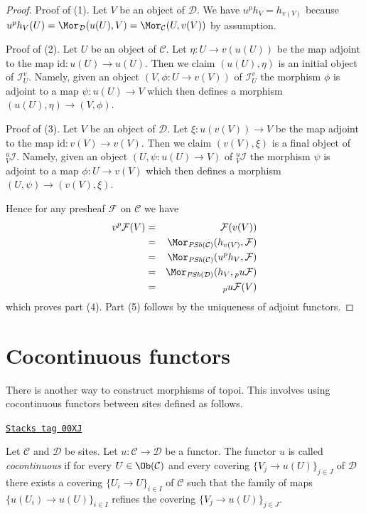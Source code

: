 \begin{proof}
Proof of (1). Let $V$ be an object of $\mathcal{D}$. We have
$u^ph_V = h_{v(V)}$ because
$u^ph_V(U) = \Mor_\mathcal{D}(u(U), V) = \Mor_\mathcal{C}(U, v(V))$
by assumption.

\medskip\noindent
Proof of (2). Let $U$ be an object of $\mathcal{C}$. Let
$\eta : U \to v(u(U))$ be the map adjoint to the map
$\text{id} : u(U) \to u(U)$. Then we claim $(u(U), \eta)$
is an initial object of $\mathcal{I}_U^v$. Namely, given
an object $(V, \phi : U \to v(V))$ of $\mathcal{I}_U^v$
the morphism $\phi$ is adjoint to a map $\psi : u(U) \to V$
which then defines a morphism $(u(U), \eta) \to (V, \phi)$.

\medskip\noindent
Proof of (3). Let $V$ be an object of $\mathcal{D}$. Let
$\xi : u(v(V)) \to V$ be the map adjoint to the map
$\text{id} : v(V) \to v(V)$. Then we claim $(v(V), \xi)$
is a final object of ${}_V^u\mathcal{I}$. Namely, given
an object $(U, \psi : u(U) \to V)$ of ${}_V^u\mathcal{I}$
the morphism $\psi$ is adjoint to a map $\phi : U \to v(V)$
which then defines a morphism $(U, \psi) \to (v(V), \xi)$.

\medskip\noindent
Hence for any presheaf $\mathcal{F}$ on $\mathcal{C}$ we have
\begin{eqnarray*}
v^p\mathcal{F}(V)
& = &
\mathcal{F}(v(V)) \\
& = &
\Mor_{\textit{PSh}(\mathcal{C})}(h_{v(V)}, \mathcal{F}) \\
& = &
\Mor_{\textit{PSh}(\mathcal{C})}(u^ph_V, \mathcal{F}) \\
& = &
\Mor_{\textit{PSh}(\mathcal{D})}(h_V, {}_pu\mathcal{F}) \\
& = &
{}_pu\mathcal{F}(V)
\end{eqnarray*}
which proves part (4). Part (5) follows by the uniqueness of adjoint functors.
\end{proof}

\section{Cocontinuous functors}
\label{sites-section-cocontinuous-functors}
There is another way to construct morphisms of topoi.
This involves using cocontinuous functors between sites defined as
follows.

\begin{definition}[Cocontinuous]
\label{sites-definition-cocontinuous}
\href{https://stacks.math.columbia.edu/tag/00XJ}{\texttt{Stacks tag 00XJ}}

Let $\mathcal{C}$ and $\mathcal{D}$ be sites.
Let $u : \mathcal{C} \to \mathcal{D}$ be a functor.
The functor $u$ is called {\it cocontinuous}
if for every $U \in \Ob(\mathcal{C})$
and every covering $\{V_j \to u(U)\}_{j \in J}$ of $\mathcal{D}$
there exists a covering
$\{U_i \to U\}_{i\in I}$ of $\mathcal{C}$
such that the family of maps $\{u(U_i) \to u(U)\}_{i \in I}$
refines the covering $\{V_j \to u(U)\}_{j \in J}$.
\end{definition}

